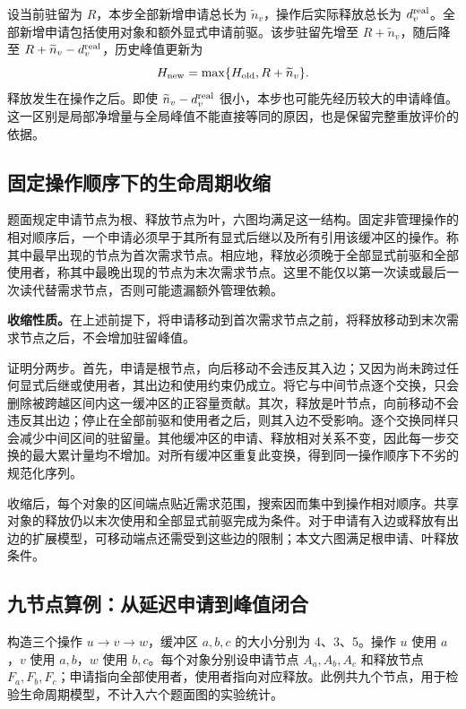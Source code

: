 设当前驻留为 $R$，本步全部新增申请总长为 $\widetilde n_v$，操作后实际释放总长为 $d_v^{\rm real}$。全部新增申请包括使用对象和额外显式申请前驱。该步驻留先增至 $R+\widetilde n_v$，随后降至 $R+\widetilde n_v-d_v^{\rm real}$，历史峰值更新为
\begin{equation}
H_{\rm new}=\max\{H_{\rm old},R+\widetilde n_v\}.
\label{eq:steppeak}
\end{equation}
释放发生在操作之后。即使 $\widetilde n_v-d_v^{\rm real}$ 很小，本步也可能先经历较大的申请峰值。这一区别是局部净增量与全局峰值不能直接等同的原因，也是保留完整重放评价的依据。

\subsection{固定操作顺序下的生命周期收缩}
题面规定申请节点为根、释放节点为叶，六图均满足这一结构。固定非管理操作的相对顺序后，一个申请必须早于其所有显式后继以及所有引用该缓冲区的操作。称其中最早出现的节点为首次需求节点。相应地，释放必须晚于全部显式前驱和全部使用者，称其中最晚出现的节点为末次需求节点。这里不能仅以第一次读或最后一次读代替需求节点，否则可能遗漏额外管理依赖。

\textbf{收缩性质。}在上述前提下，将申请移动到首次需求节点之前，将释放移动到末次需求节点之后，不会增加驻留峰值。

证明分两步。首先，申请是根节点，向后移动不会违反其入边；又因为尚未跨过任何显式后继或使用者，其出边和使用约束仍成立。将它与中间节点逐个交换，只会删除被跨越区间内这一缓冲区的正容量贡献。其次，释放是叶节点，向前移动不会违反其出边；停止在全部前驱和使用者之后，则其入边不受影响。逐个交换同样只会减少中间区间的驻留量。其他缓冲区的申请、释放相对关系不变，因此每一步交换的最大累计量均不增加。对所有缓冲区重复此变换，得到同一操作顺序下不劣的规范化序列。

收缩后，每个对象的区间端点贴近需求范围，搜索因而集中到操作相对顺序。共享对象的释放仍以末次使用和全部显式前驱完成为条件。对于申请有入边或释放有出边的扩展模型，可移动端点还需受到这些边的限制；本文六图满足根申请、叶释放条件。

\subsection{九节点算例：从延迟申请到峰值闭合}
构造三个操作 $u\to v\to w$，缓冲区 $a,b,c$ 的大小分别为 4、3、5。操作 $u$ 使用 $a$，$v$ 使用 $a,b$，$w$ 使用 $b,c$。每个对象分别设申请节点 $A_a,A_b,A_c$ 和释放节点 $F_a,F_b,F_c$；申请指向全部使用者，使用者指向对应释放。此例共九个节点，用于检验生命周期模型，不计入六个题面图的实验统计。

